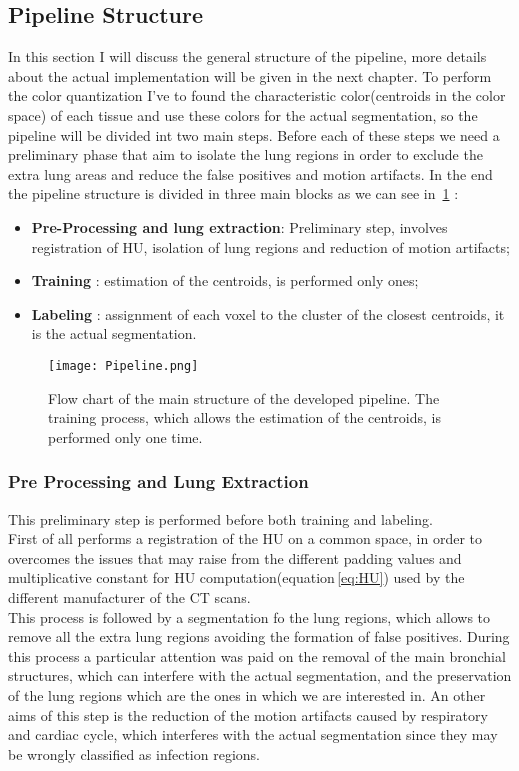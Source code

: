 \documentclass{standalone}
\begin{document}
	\subsection{Pipeline Structure}
	
	In this section I will discuss the general structure of the pipeline, more details about the actual implementation will be given in the next chapter.
	To perform the color quantization I've to found the characteristic color(centroids in the color space) of each tissue and use these colors for the actual segmentation, so the pipeline will be divided int two main steps. Before each of these steps we need a preliminary phase that aim to isolate the lung regions in order to exclude the extra lung areas and reduce the false positives and motion artifacts.
	In the end the pipeline structure is divided in three main blocks as we can see in \figurename\,\ref{fig:Pipeline} : 
	\begin{itemize}
		\item \textbf{Pre-Processing and lung extraction}: Preliminary step, involves registration of HU, isolation of lung regions and reduction of motion artifacts;
		\item \textbf{Training} : estimation of the centroids, is performed only ones; 
		
		\item \textbf{Labeling} :  assignment of each voxel to the cluster of the closest centroids, it is the actual segmentation.
	\end{itemize}
	
		
	\begin{figure}[h!]
		\centering 
			\texttt{[image: Pipeline.png]}
		\label{fig:Pipeline}\caption{Flow chart of the main structure of the developed pipeline. The training process, which allows the estimation of the centroids, is performed only one time.}
	\end{figure} 
	
	\subsubsection*{Pre Processing and Lung Extraction}
	
	This preliminary step is performed before both training and labeling.\\
	First of all performs a registration of the HU on a common space, in order to overcomes the issues that may raise from the different padding values and multiplicative constant for HU computation(equation\,\ref{eq:HU}) used by the different manufacturer of the CT scans.\\
	This process is followed by a segmentation fo the lung regions, which allows to remove all the extra lung regions avoiding the formation of false positives. During this process a particular attention was paid on the removal of the main bronchial structures, which can interfere with the actual segmentation, and the preservation of the lung regions which are the ones in which we are interested in. An other aims of this step is the reduction of the motion artifacts caused by respiratory and cardiac cycle, which interferes with the actual segmentation since they may be wrongly classified as infection regions.
	
\end{document}
